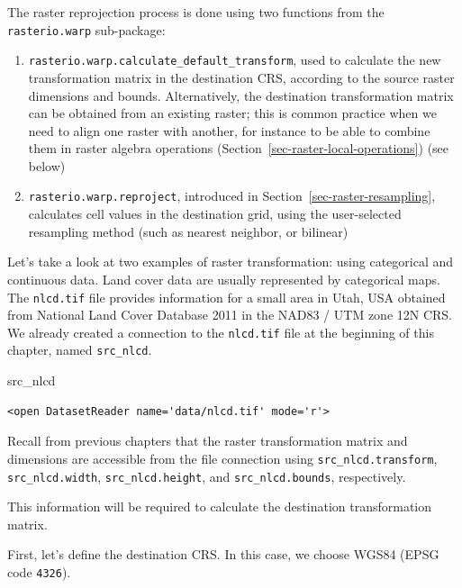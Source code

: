 \documentclass[
  letterpaper,
]{krantz}
\newenvironment{Shaded}{\begin{snugshade}}{\end{snugshade}}
\newcommand{\NormalTok}[1]{\textcolor[rgb]{0.00,0.23,0.31}{#1}}
\providecommand{\tightlist}{%
  \setlength{\itemsep}{0pt}\setlength{\parskip}{0pt}}\usepackage{longtable,booktabs,array}
\begin{document}
The raster reprojection process is done using two functions from the
\texttt{rasterio.warp} sub-package:

\begin{enumerate}
\def\labelenumi{\arabic{enumi}.}
\tightlist
\item
  \texttt{rasterio.warp.calculate\_default\_transform}, used to
  calculate the new transformation matrix in the destination CRS,
  according to the source raster dimensions and bounds. Alternatively,
  the destination transformation matrix can be obtained from an existing
  raster; this is common practice when we need to align one raster with
  another, for instance to be able to combine them in raster algebra
  operations (Section~\ref{sec-raster-local-operations}) (see below)
\item
  \texttt{rasterio.warp.reproject}, introduced in
  Section~\ref{sec-raster-resampling}, calculates cell values in the
  destination grid, using the user-selected resampling method (such as
  nearest neighbor, or bilinear)
\end{enumerate}

Let's take a look at two examples of raster transformation: using
categorical and continuous data. Land cover data are usually represented
by categorical maps. The \texttt{nlcd.tif} file provides information for
a small area in Utah, USA obtained from National Land Cover Database
2011 in the NAD83 / UTM zone 12N CRS. We already created a connection to
the \texttt{nlcd.tif} file at the beginning of this chapter, named
\texttt{src\_nlcd}.

\begin{Shaded}
\begin{Highlighting}[]
\NormalTok{src\_nlcd}
\end{Highlighting}
\end{Shaded}

\begin{verbatim}
<open DatasetReader name='data/nlcd.tif' mode='r'>
\end{verbatim}

Recall from previous chapters that the raster transformation matrix and
dimensions are accessible from the file connection using
\texttt{src\_nlcd.transform}, \texttt{src\_nlcd.width},
\texttt{src\_nlcd.height}, and \texttt{src\_nlcd.bounds}, respectively.

This information will be required to calculate the destination
transformation matrix.

First, let's define the destination CRS. In this case, we choose WGS84
(EPSG code \texttt{4326}).
\end{document}
